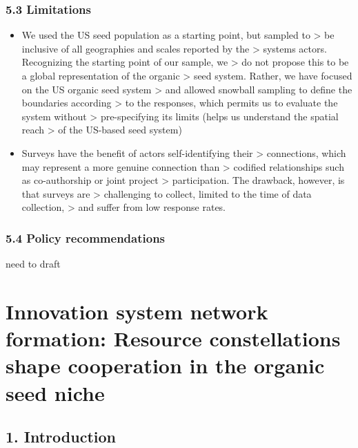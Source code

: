 \documentclass[twoside,12pt,final]{ucthesis-CA2012}
\begin{document}
\begin{ucmainmatter}
{\subsection{5.3 Limitations}\label{limitations}}
\begin{itemize}
\item
  We used the US seed population as a starting point, but sampled to
  \textgreater{} be inclusive of all geographies and scales reported by the
  \textgreater{} system\textquotesingle s actors. Recognizing the starting point of our sample, we
  \textgreater{} do not propose this to be a global representation of the organic
  \textgreater{} seed system. Rather, we have focused on the US organic seed system
  \textgreater{} and allowed snowball sampling to define the boundaries according
  \textgreater{} to the responses, which permits us to evaluate the system without
  \textgreater{} pre-specifying its limits (helps us understand the spatial reach
  \textgreater{} of the US-based seed system)
\item
  Surveys have the benefit of actors self-identifying their
  \textgreater{} connections, which may represent a more genuine connection than
  \textgreater{} codified relationships such as co-authorship or joint project
  \textgreater{} participation. The drawback, however, is that surveys are
  \textgreater{} challenging to collect, limited to the time of data collection,
  \textgreater{} and suffer from low response rates.
\end{itemize}
\hypertarget{policy-recommendations}{%
\subsection{5.4 Policy recommendations}\label{policy-recommendations}}

need to draft

\hypertarget{innovation-system-network-formation-resource-constellations-shape-cooperation-in-the-organic-seed-niche}{%
\chapter{Innovation system network formation: Resource constellations shape cooperation in the organic seed niche}\label{innovation-system-network-formation-resource-constellations-shape-cooperation-in-the-organic-seed-niche}}


\hypertarget{introduction-3}{%
\section{1. Introduction}\label{introduction-3}}


\end{ucmainmatter}
\end{document}
